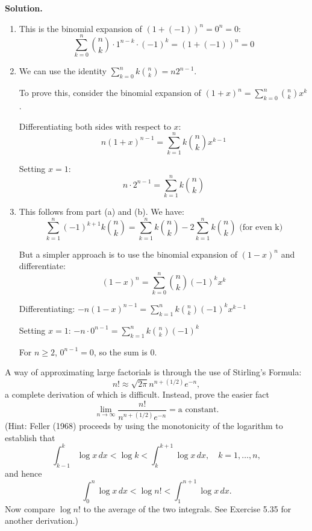\noindent\textbf{Solution.}
\begin{enumerate}[label=(\alph*)]
    \item This is the binomial expansion of $(1 + (-1))^n = 0^n = 0$:
    \[ \sum_{k=0}^{n} \binom{n}{k} \cdot 1^{n-k} \cdot (-1)^k = (1 + (-1))^n = 0 \]
    
    \item We can use the identity $\sum_{k=0}^{n} k \binom{n}{k} = n2^{n-1}$.
    
    To prove this, consider the binomial expansion of $(1 + x)^n = \sum_{k=0}^{n} \binom{n}{k} x^k$.
    
    Differentiating both sides with respect to $x$:
    \[ n(1 + x)^{n-1} = \sum_{k=1}^{n} k \binom{n}{k} x^{k-1} \]
    
    Setting $x = 1$:
    \[ n \cdot 2^{n-1} = \sum_{k=1}^{n} k \binom{n}{k} \]
    
    \item This follows from part (a) and (b). We have:
    \[ \sum_{k=1}^{n} (-1)^{k+1} k \binom{n}{k} = \sum_{k=1}^{n} k \binom{n}{k} - 2 \sum_{k=1}^{n} k \binom{n}{k} \text{ (for even k)} \]
    
    But a simpler approach is to use the binomial expansion of $(1 - x)^n$ and differentiate:
    \[ (1 - x)^n = \sum_{k=0}^{n} \binom{n}{k} (-1)^k x^k \]
    
    Differentiating: $-n(1 - x)^{n-1} = \sum_{k=1}^{n} k \binom{n}{k} (-1)^k x^{k-1}$
    
    Setting $x = 1$: $-n \cdot 0^{n-1} = \sum_{k=1}^{n} k \binom{n}{k} (-1)^k$
    
    For $n \geq 2$, $0^{n-1} = 0$, so the sum is 0.
\end{enumerate}


\begin{problembox}
A way of approximating large factorials is through the use of Stirling's Formula:
\[ n!\approx\sqrt{2\pi}n^{n+(1/2)}e^{-n}, \]
a complete derivation of which is difficult. Instead, prove the easier fact
\[ \lim_{n\to\infty}\frac{n!}{n^{n+(1/2)}e^{-n}}=\text{a constant}. \]
(Hint: Feller (1968) proceeds by using the monotonicity of the logarithm to establish that
\[ \int_{k-1}^{k}\log x\,dx<\log k<\int_{k}^{k+1}\log x\,dx,\quad k=1,\ldots,n, \]
and hence
\[ \int_{0}^{n}\log x\,dx<\log n!<\int_{1}^{n+1}\log x\,dx. \]
Now compare $\log n!$ to the average of the two integrals. See Exercise 5.35 for another derivation.)
\end{problembox}

